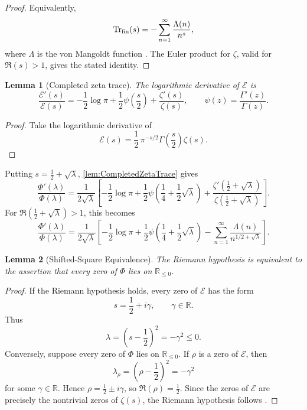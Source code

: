 \documentclass[pdflatex,sn-mathphys-num]{sn-jnl}
\theoremstyle{thmstyleone}
\newtheorem{lemma}[lemma]{Lemma}
\theoremstyle{thmstylethree}%
\theoremstyle{thmstyletwo}%
\begin{document}
\begin{proof}
Equivalently,
\[
  \operatorname{Tr}_{\mathrm{fin}}(s)
  =
  -\sum_{n=1}^{\infty}\frac{\Lambda(n)}{n^s},
\]
where \(\Lambda\) is the von Mangoldt function
\cite{IwaniecKowalski2004}. The Euler product for \(\zeta\), valid for
\(\Re(s)>1\), gives the stated identity.
\end{proof}

\begin{lemma}[Completed zeta trace]
\label{lem:CompletedZetaTrace}
The logarithmic derivative of \(\mathcal E\) is
\[
  \frac{\mathcal E'(s)}{\mathcal E(s)}
  =
  -\frac12\log\pi
  +\frac12\psi\left(\frac{s}{2}\right)
  +\frac{\zeta'(s)}{\zeta(s)},
  \qquad
  \psi(z)=\frac{\Gamma'(z)}{\Gamma(z)}.
\]
\end{lemma}

\begin{proof}
Take the logarithmic derivative of
\[
  \mathcal E(s)
  =
  \frac12\,\pi^{-s/2}\Gamma\left(\frac{s}{2}\right)\zeta(s).
\]
\end{proof}

\noindent Putting \(s=\frac12+\sqrt{\lambda}\), \autoref{lem:CompletedZetaTrace} gives
\[
  \frac{\Phi'(\lambda)}{\Phi(\lambda)}
  =
  \frac{1}{2\sqrt{\lambda}}
  \left[
    -\frac12\log\pi
    +\frac12\psi\left(\frac14+\frac12\sqrt{\lambda}\right)
    +\frac{\zeta'(\frac12+\sqrt{\lambda})}
           {\zeta(\frac12+\sqrt{\lambda})}
  \right].
\]
For \(\Re(\frac12+\sqrt{\lambda})>1\), this becomes
\[
  \frac{\Phi'(\lambda)}{\Phi(\lambda)}
  =
  \frac{1}{2\sqrt{\lambda}}
  \left[
    -\frac12\log\pi
    +\frac12\psi\left(\frac14+\frac12\sqrt{\lambda}\right)
    -\sum_{n=1}^{\infty}
      \frac{\Lambda(n)}{n^{1/2+\sqrt{\lambda}}}
  \right].
\]

\begin{lemma}[Shifted-Square Equivalence]
\label{lem:ShiftedSquareEquivalence}
The Riemann hypothesis is equivalent to the assertion that every zero of
\(\Phi\) lies on \(\mathbb R_{\le0}\).
\end{lemma}

\begin{proof}
If the Riemann hypothesis holds, every zero of \(\mathcal E\) has the form
\[
  s=\frac12+i\gamma,
  \qquad \gamma\in\mathbb R.
\]
Thus
\[
  \lambda=\left(s-\frac12\right)^2=-\gamma^2\le0.
\]
Conversely, suppose every zero of \(\Phi\) lies on \(\mathbb R_{\le0}\). If
\(\rho\) is a zero of \(\mathcal E\), then
\[
  \lambda_\rho=\left(\rho-\frac12\right)^2=-\gamma^2
\]
for some \(\gamma\in\mathbb R\). Hence
\(\rho=\frac12\pm i\gamma\), so \(\Re(\rho)=\frac12\). Since the zeros of
\(\mathcal E\) are precisely the nontrivial zeros of \(\zeta(s)\), the Riemann
hypothesis follows \cite{Titchmarsh1986}.
\end{proof}
\end{document}
